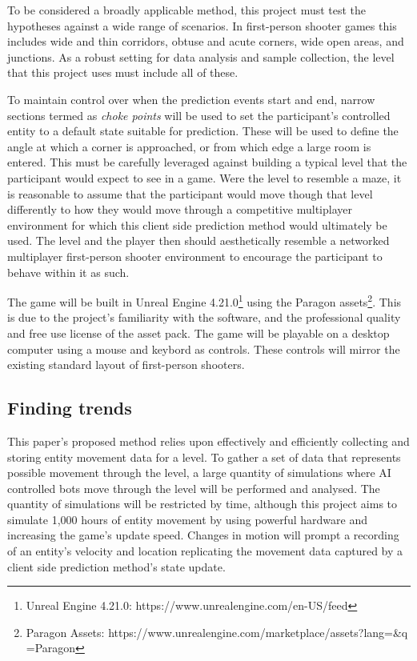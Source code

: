 \documentclass[journal]{IEEEtran}
\begin{document}
To be considered a broadly applicable method, this project must test the hypotheses against a wide range of scenarios. In first-person shooter games this includes wide and thin corridors, obtuse and acute corners, wide open areas, and junctions. As a robust setting for data analysis and sample collection, the level that this project uses must include all of these.

To maintain control over when the prediction events start and end, narrow sections termed as \textit{choke points} will be used to set the participant's controlled entity to a default state suitable for prediction. These will be used to define the angle at which a corner is approached, or from which edge a large room is entered. This must be carefully leveraged against building a typical level that the participant would expect to see in a game. Were the level to resemble a maze, it is reasonable to assume that the participant would move though that level differently to how they would move through a competitive multiplayer environment for which this client side prediction method would ultimately be used. The level and the player then should aesthetically resemble a networked multiplayer first-person shooter environment to encourage the participant to behave within it as such.

The game will be built in Unreal Engine 4.21.0\footnote[1]{Unreal Engine 4.21.0: https://www.unrealengine.com/en-US/feed} using the Paragon assets\footnote[2]{Paragon Assets: https://www.unrealengine.com/marketplace/assets?lang=&q =Paragon}. This is due to the project's familiarity with the software, and the professional quality and free use license of the asset pack. The game will be playable on a desktop computer using a mouse and keybord as controls. These controls will mirror the existing standard layout of first-person shooters.

\subsection{Finding trends}

This paper's proposed method relies upon effectively and efficiently collecting and storing entity movement data for a level. To gather a set of data that represents possible movement through the level, a large quantity of simulations where AI controlled bots move through the level will be performed and analysed. The quantity of simulations will be restricted by time, although this project aims to simulate 1,000 hours of entity movement by using powerful hardware and increasing the game's update speed. Changes in motion will prompt a recording of an entity's velocity and location replicating the movement data captured by a client side prediction method's state update.
\end{document}
